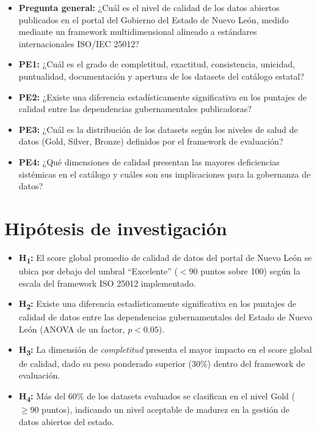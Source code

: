 \documentclass[12pt,letterpaper]{article}
\begin{document}
\begin{itemize}
  \item \textbf{Pregunta general:} ¿Cuál es el nivel de calidad de los datos abiertos publicados en el portal del Gobierno del Estado de Nuevo León, medido mediante un framework multidimensional alineado a estándares internacionales ISO/IEC 25012?

  \item \textbf{PE1:} ¿Cuál es el grado de completitud, exactitud, consistencia, unicidad, puntualidad, documentación y apertura de los datasets del catálogo estatal?

  \item \textbf{PE2:} ¿Existe una diferencia estadísticamente significativa en los puntajes de calidad entre las dependencias gubernamentales publicadoras?

  \item \textbf{PE3:} ¿Cuál es la distribución de los datasets según los niveles de salud de datos (Gold, Silver, Bronze) definidos por el framework de evaluación?

  \item \textbf{PE4:} ¿Qué dimensiones de calidad presentan las mayores deficiencias sistémicas en el catálogo y cuáles son sus implicaciones para la gobernanza de datos?
\end{itemize}

\section{Hipótesis de investigación}

\begin{itemize}
  \item \textbf{H\textsubscript{1}:} El score global promedio de calidad de datos del portal de Nuevo León se ubica por debajo del umbral ``Excelente'' ($< 90$ puntos sobre 100) según la escala del framework ISO 25012 implementado.

  \item \textbf{H\textsubscript{2}:} Existe una diferencia estadísticamente significativa en los puntajes de calidad de datos entre las dependencias gubernamentales del Estado de Nuevo León (ANOVA de un factor, $p < 0.05$).

  \item \textbf{H\textsubscript{3}:} La dimensión de \textit{completitud} presenta el mayor impacto en el score global de calidad, dado su peso ponderado superior (30\%) dentro del framework de evaluación.

  \item \textbf{H\textsubscript{4}:} Más del 60\% de los datasets evaluados se clasifican en el nivel Gold ($\geq 90$ puntos), indicando un nivel aceptable de madurez en la gestión de datos abiertos del estado.
\end{itemize}
\end{document}
